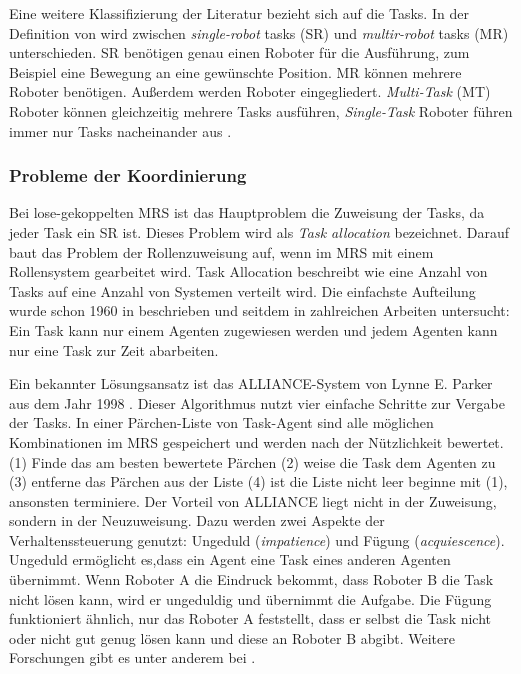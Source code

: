 Eine weitere Klassifizierung der Literatur bezieht sich auf die Tasks. In der Definition von \cite{gerkey2004formal} wird zwischen \textit{single-robot} tasks (SR) und \textit{multir-robot} tasks (MR) unterschieden. SR benötigen genau einen Roboter für die Ausführung, zum Beispiel eine Bewegung an eine gewünschte Position. MR können mehrere Roboter benötigen. Außerdem werden Roboter eingegliedert.\textit{ Multi-Task} (MT) Roboter können gleichzeitig mehrere Tasks ausführen, \textit{Single-Task} Roboter führen immer nur Tasks nacheinander aus \citep{lundh2006plan}. 

\subsubsection{Probleme der Koordinierung}
Bei lose-gekoppelten MRS ist das Hauptproblem die Zuweisung der Tasks, da jeder Task ein SR ist. Dieses Problem wird als \textit{Task allocation} bezeichnet. Darauf baut das Problem der Rollenzuweisung auf, wenn im MRS mit einem Rollensystem gearbeitet wird. Task Allocation beschreibt wie eine Anzahl von Tasks auf eine Anzahl von Systemen verteilt wird. Die einfachste Aufteilung wurde schon 1960 in \cite{gale1989theory} beschrieben und seitdem in zahlreichen Arbeiten untersucht: Ein Task kann nur einem Agenten zugewiesen werden und jedem Agenten kann nur eine Task zur Zeit abarbeiten.

Ein bekannter Lösungsansatz ist das ALLIANCE-System von Lynne E. Parker aus dem Jahr 1998 \cite{parker1998alliance}. Dieser Algorithmus nutzt vier einfache Schritte zur Vergabe der Tasks. In einer Pärchen-Liste von Task-Agent sind alle möglichen Kombinationen im MRS gespeichert und werden nach der Nützlichkeit bewertet. (1) Finde das am besten bewertete Pärchen (2) weise die Task dem Agenten zu (3) entferne das Pärchen aus der Liste (4) ist die Liste nicht leer beginne mit (1), ansonsten terminiere. Der Vorteil von ALLIANCE liegt nicht in der Zuweisung, sondern in der Neuzuweisung. Dazu werden zwei Aspekte der Verhaltenssteuerung genutzt: Ungeduld (\textit{impatience}) und Fügung (\textit{acquiescence}). Ungeduld ermöglicht es,dass ein Agent eine Task eines anderen Agenten übernimmt. Wenn Roboter A die Eindruck bekommt, dass Roboter B die Task nicht lösen kann, wird er ungeduldig und übernimmt die Aufgabe. Die Fügung funktioniert ähnlich, nur das Roboter A feststellt, dass er selbst die Task nicht oder nicht gut genug lösen kann und diese an Roboter B abgibt. Weitere Forschungen gibt es unter anderem bei \cite{werger2000broadcast}.

